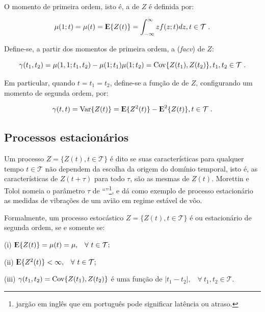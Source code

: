 O momento de primeira ordem, isto é, a  de $Z$ é definida por: 

\begin{equation}\label{series:2.5}
\mu(1; t) = \mu(t) = {\rm I\kern-.3em E}\{Z(t)\} = \int_{-\infty}^{\infty} z f(z;t)dz, t \in \mathcal{T}\;.
\end{equation}

Define-se, a partir dos momentos de primeira ordem, a  (\emph{facv}) de $Z$:

\begin{equation}\label{series:2.6}
\gamma(t_1, t_2) = \mu(1,1; t_1,t_2) - \mu(1; t_1)\mu(1; t_2) = \mathrm{Cov}\{Z(t_1),Z(t_2)\}, t_1,t_2 \in \mathcal{T}\;.
\end{equation}

Em particular, quando $t = t_1 = t_2$, define-se a função de  de $Z$, configurando um momento de segunda ordem, por:

\begin{equation}\label{series:2.7}
\gamma(t, t) = \mathrm{Var}\{Z(t)\} = {\rm I\kern-.3em E}\{Z^2(t)\} - {\rm I\kern-.3em E}^2\{Z(t)\}, t \in \mathcal{T}\;.
\end{equation}

\subsection{Processos estacionários}

Um processo $Z = \{Z(t), t \in \mathcal{T}\}$ é dito  se suas características para qualquer tempo $t \in \mathcal{T}$ não dependem da escolha da origem do domínio temporal, isto é, as características de $Z(t + \tau)$ para todo $\tau$, são as mesmas de $Z(t)$. Morettin e Toloi \citep{morettin} nomeia o parâmetro $\tau$ de ``''\footnote{jargão em inglês que em português pode significar latência ou atraso.}, e dá como exemplo de processo estacionário as medidas de vibrações de um avião em regime estável de vôo.

Formalmente, um processo estocástico $Z = \{Z(t), t \in \mathcal{T}\}$ é  ou estacionário de segunda ordem, se e somente se:

	(i) ${\rm I\kern-.3em E}\{Z(t)\} = \mu(t) = \mu, \;\;\; \forall ~ t \in \mathcal{T};$

	(ii) ${\rm I\kern-.3em E}\{Z^2(t)\} < \infty, \;\;\; \forall ~ t \in \mathcal{T};$

	(iii) $\gamma(t_1, t_2) = \mathrm{Cov}\{Z(t_1), Z(t_2)\}$ é uma função de $|t_1 - t_2|, \;\;\; \forall~ t_1, t_2 \in \mathcal{T}.$

